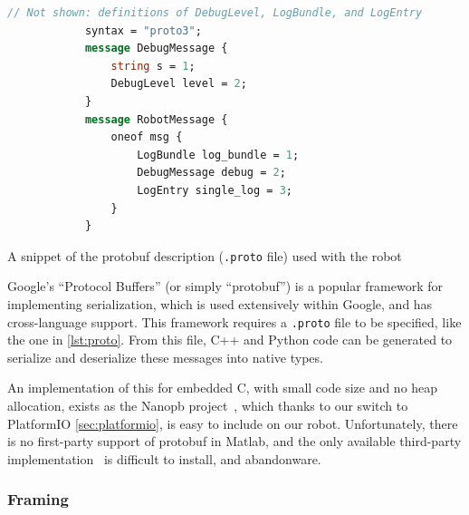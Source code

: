 \documentclass[main.tex]{subfiles}
\begin{document}
		\begin{listingfloat}[t]
			\begin{lstlisting}[language=proto, gobble=6, frame=single]
			// Not shown: definitions of DebugLevel, LogBundle, and LogEntry
			syntax = "proto3";
			message DebugMessage {
				string s = 1;
				DebugLevel level = 2;
			}
			message RobotMessage {
				oneof msg {
					LogBundle log_bundle = 1;
					DebugMessage debug = 2;
					LogEntry single_log = 3;
				}
			}
			\end{lstlisting}
			\caption{A snippet of the protobuf description (\texttt{.proto} file) used with the robot}
			\label{lst:proto}
		\end{listingfloat}
		Google’s \enquote{Protocol Buffers}\cite{protobuf} (or simply \enquote{protobuf}) is a popular framework for implementing serialization, which is used extensively within Google, and has cross-language support.
		This framework requires a \texttt{.proto} file to be specified, like the one in \cref{lst:proto}.
		From this file, C++ and Python code can be generated to serialize and deserialize these messages into native types.

		An implementation of this for embedded C, with small code size and no heap allocation, exists as the Nanopb project~\cite{nanopb}, which thanks to our switch to PlatformIO \cref{sec:platformio}, is easy to include on our robot.
		Unfortunately, there is no first-party support of protobuf in Matlab, and the only available third-party implementation~\cite{protobuf-matlab} is difficult to install, and abandonware.\footnotemark


	\subsubsection{Framing}
\end{document}
